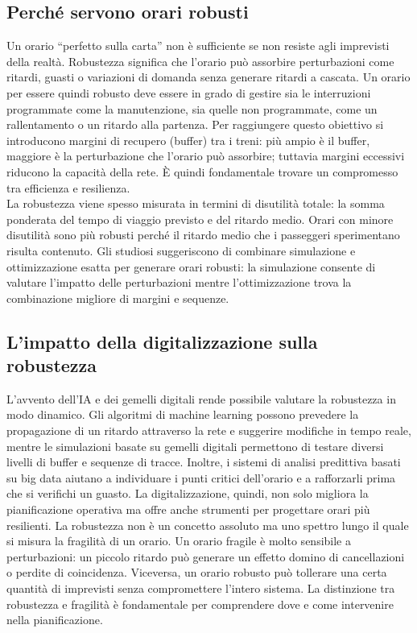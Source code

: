 \documentclass[a4paper,12pt]{report}
\begin{document}
\subsection{Perché servono orari robusti}
Un orario “perfetto sulla carta” non è sufficiente se non resiste agli imprevisti della realtà. Robustezza significa che l’orario può assorbire perturbazioni come ritardi, guasti o variazioni di domanda senza generare ritardi a cascata. Un orario per essere quindi robusto deve essere in grado di gestire sia le interruzioni programmate come la manutenzione, sia quelle non programmate, come un rallentamento o un ritardo alla partenza.
Per raggiungere questo obiettivo si introducono margini di recupero (buffer) tra i treni: più ampio è il buffer, maggiore è la perturbazione che l’orario può assorbire; tuttavia margini eccessivi riducono la capacità della rete. È quindi fondamentale trovare un compromesso tra efficienza e resilienza. \\ La robustezza viene spesso misurata in termini di disutilità totale: la somma ponderata del tempo di viaggio previsto e del ritardo medio. Orari con minore disutilità sono più robusti perché il ritardo medio che i passeggeri sperimentano risulta contenuto.
Gli studiosi suggeriscono di combinare simulazione e ottimizzazione esatta per generare orari robusti: la simulazione consente di valutare l’impatto delle perturbazioni mentre l’ottimizzazione trova la combinazione migliore di margini e sequenze.




\subsection{L’impatto della digitalizzazione sulla robustezza}
L’avvento dell’IA e dei gemelli digitali rende possibile valutare la robustezza in modo dinamico. Gli algoritmi di machine learning possono prevedere la propagazione di un ritardo attraverso la rete e suggerire modifiche in tempo reale, mentre le simulazioni basate su gemelli digitali permettono di testare diversi livelli di buffer e sequenze di tracce. 
Inoltre, i sistemi di analisi predittiva basati su big data aiutano a individuare i punti critici dell’orario e a rafforzarli prima che si verifichi un guasto.
La digitalizzazione, quindi, non solo migliora la pianificazione operativa ma offre anche strumenti per progettare orari più resilienti.
La robustezza non è un concetto assoluto ma uno spettro lungo il quale si misura la fragilità di un orario. Un orario fragile è molto sensibile a perturbazioni: un piccolo ritardo può generare un effetto domino di cancellazioni o perdite di coincidenza. Viceversa, un orario robusto può tollerare una certa quantità di imprevisti senza compromettere l’intero sistema. La distinzione tra robustezza e fragilità è fondamentale per comprendere dove e come intervenire nella pianificazione.
\end{document}
